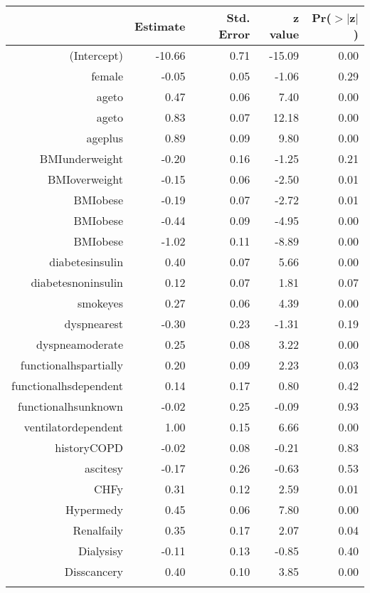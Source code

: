 \bigskip\bigskip
\centering
\begin{tabular}{rrrrr}
  \hline
 & Estimate & Std. Error & z value & Pr($>$$|$z$|$) \\ 
  \hline
(Intercept) & -10.66 & 0.71 & -15.09 & 0.00 \\ 
  female & -0.05 & 0.05 & -1.06 & 0.29 \\ 
  age\-65\-to\-74 & 0.47 & 0.06 & 7.40 & 0.00 \\ 
  age\-75\-to\-84 & 0.83 & 0.07 & 12.18 & 0.00 \\ 
  age\-85\-plus & 0.89 & 0.09 & 9.80 & 0.00 \\ 
  BMI\-underweight & -0.20 & 0.16 & -1.25 & 0.21 \\ 
  BMI\-overweight & -0.15 & 0.06 & -2.50 & 0.01 \\ 
  BMI\-obese\-1 & -0.19 & 0.07 & -2.72 & 0.01 \\ 
  BMI\-obese\-2 & -0.44 & 0.09 & -4.95 & 0.00 \\ 
  BMI\-obese\-3 & -1.02 & 0.11 & -8.89 & 0.00 \\ 
  diabetes\-insulin & 0.40 & 0.07 & 5.66 & 0.00 \\ 
  diabetes\-noninsulin & 0.12 & 0.07 & 1.81 & 0.07 \\ 
  smoke\-yes & 0.27 & 0.06 & 4.39 & 0.00 \\ 
  dyspnea\-rest & -0.30 & 0.23 & -1.31 & 0.19 \\ 
  dyspnea\-moderate & 0.25 & 0.08 & 3.22 & 0.00 \\ 
  functional\-hs\-partially & 0.20 & 0.09 & 2.23 & 0.03 \\ 
  functional\-hs\-dependent & 0.14 & 0.17 & 0.80 & 0.42 \\ 
  functional\-hs\-unknown & -0.02 & 0.25 & -0.09 & 0.93 \\ 
  ventilator\-dependent & 1.00 & 0.15 & 6.66 & 0.00 \\ 
  history\-COPD & -0.02 & 0.08 & -0.21 & 0.83 \\ 
  ascites\-y & -0.17 & 0.26 & -0.63 & 0.53 \\ 
  CHF\-y & 0.31 & 0.12 & 2.59 & 0.01 \\ 
  Hyper\-med\-y & 0.45 & 0.06 & 7.80 & 0.00 \\ 
  Renal\-fail\-y & 0.35 & 0.17 & 2.07 & 0.04 \\ 
  Dialysis\-y & -0.11 & 0.13 & -0.85 & 0.40 \\ 
  Diss\-cancer\-y & 0.40 & 0.10 & 3.85 & 0.00 \\ 
$$
\end{tabular}

